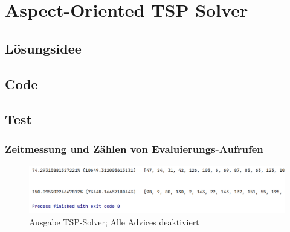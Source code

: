 \documentclass[german,notitlepage,smartquotes]{hgbreport}
\begin{document}

\clearpage

\section{Aspect-Oriented TSP Solver}

\subsection{Lösungsidee}



\subsection{Code}








\clearpage

\subsection{Test}

\subsubsection{Zeitmessung und Zählen von Evaluierungs-Aufrufen}

\begin{figure}[h]
\centering
\includegraphics[width=.9\textwidth]{tsp-test-00}
\caption{Ausgabe TSP-Solver; Alle Advices deaktiviert}
\label{tsp-test-00}
\end{figure}
\end{document}
